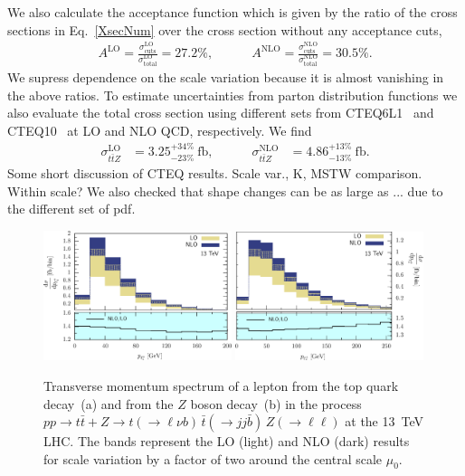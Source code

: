 \documentclass[preprint]{JHEP3} %
\def\ttb{t\bar{t}}
\newcommand{\be}{\begin{eqnarray}}
\newcommand{\ee}{\end{eqnarray}}
\begin{document}
We also calculate the acceptance function which is given by the ratio of the cross sections in Eq.~\ref{XsecNum} over the 
cross section without any acceptance cuts, 
\be
  A^\mathrm{LO} = \frac{\sigma_{\mathrm{cuts}}^\mathrm{LO}}{\sigma_{\mathrm{total}}^\mathrm{LO}} = 27.2 \% ,
  \quad\quad\quad
  A^\mathrm{NLO} = \frac{\sigma_{\mathrm{cuts}}^\mathrm{NLO}}{\sigma_{\mathrm{total}}^\mathrm{NLO}} = 30.5 \%.
\ee
We supress dependence on the scale variation because it is almost vanishing in the above ratios.
To estimate uncertainties from parton distribution functions we also evaluate the total cross section
using different sets from CTEQ6L1~\cite{Pumplin:2002vw} and CTEQ10~\cite{Lai:2010vv} at LO and NLO QCD, respectively. 
We find 
\be
\label{XsecNumCTEQ}
  \sigma_{\ttb Z}^\mathrm{LO} &= 3.25^{+34\%}_{-23\%}~\mathrm{fb},
  \quad\quad\quad
  \sigma_{\ttb Z}^\mathrm{NLO} &= 4.86^{+13\%}_{-13\%}~\mathrm{fb}.
\ee
Some short discussion of CTEQ results. Scale var., K, MSTW comparison. Within scale?
We also checked that shape changes can be as large as ... due to the different set of pdf.

\begin{figure}[t]
\centering %
\includegraphics[width=0.49\textwidth]{./LHC_53_Fig01.eps}
\hfill
\includegraphics[width=0.49\textwidth]{./LHC_53_Fig03.eps}
\caption{\label{fig:iii} Transverse momentum spectrum of a lepton from the top quark decay~(a) and from the $Z$ boson decay~(b) 
in the process $pp \to \ttb + Z \to t(\to \ell \nu b) \, \bar{t} (\to jj \bar{b}) \, Z(\to \ell \ell)$ at the 13~TeV LHC.
The bands represent the LO (light) and NLO (dark) results for scale variation by a factor of two around the central scale $\mu_0$.}
\end{figure}
\end{document}
